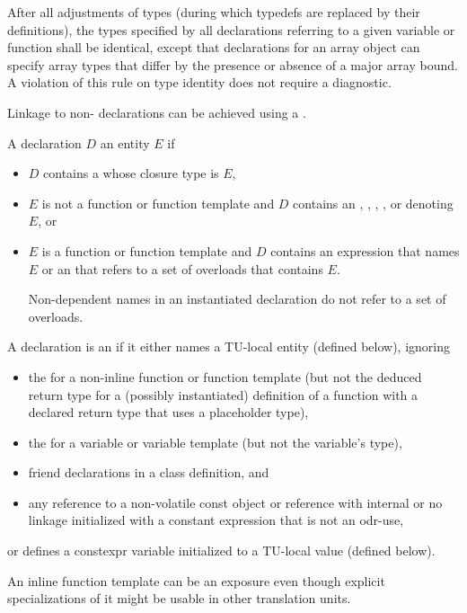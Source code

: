 \pnum
{}%
%
After all adjustments of types (during which
typedefs are replaced by their definitions), the
types specified by all declarations referring to a given variable or
function shall be identical, except that declarations for an array
object can specify array types that differ by the presence or absence of
a major array bound. A violation of this rule on type
identity does not require a diagnostic.

\pnum
\begin{note}
Linkage to non-\Cpp{} declarations can be achieved using a
.
\end{note}

\pnum
A declaration $D$  an entity $E$ if
\begin{itemize}
\item
$D$ contains a  whose closure type is $E$,
\item
$E$ is not a function or function template and $D$ contains an
,
,
,
, or
denoting $E$, or
\item
$E$ is a function or function template and
$D$ contains an expression that names $E$ or
an 
that refers to a set of overloads that contains $E$.
\begin{note}
Non-dependent names in an instantiated declaration
do not refer to a set of overloads.
\end{note}
\end{itemize}

\pnum
A declaration is an 
if it either names a TU-local entity (defined below), ignoring
\begin{itemize}
\item
the 
for a non-inline function or function template
(but not the deduced return type
for a (possibly instantiated) definition of a function
with a declared return type that uses a placeholder type),
\item
the 
for a variable or variable template (but not the variable's type),
\item
friend declarations in a class definition, and
\item
any reference to a non-volatile const object or reference
with internal or no linkage initialized with a constant expression
that is not an odr-use,
\end{itemize}
or defines a constexpr variable initialized to a TU-local value (defined below).
\begin{note}
An inline function template can be an exposure even though
explicit specializations of it might be usable in other translation units.
\end{note}

